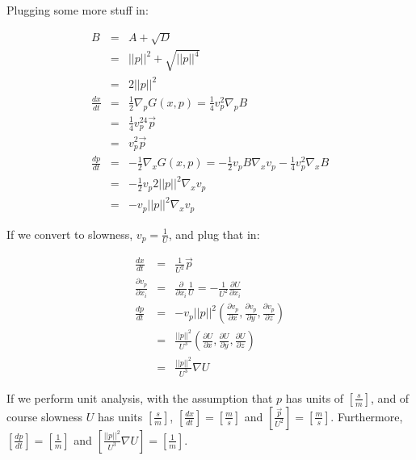 \documentclass[12pt]{article}
\begin{document}
Plugging some more stuff in:

\begin{eqnarray}
B               &=&  A + \sqrt{D}\\
                &=&  ||p||^2 + \sqrt{||p||^4}\\
                &=&  2||p||^2\\
\frac{dx}{dt}   &=&  \frac{1}{2}\nabla_p G(x,p) =  \frac{1}{4}v_p^2\nabla_pB\\
                &=&  \frac{1}{4}v_p^24\vec{p}\\
                &=&  v_p^2\vec{p}\\
\frac{dp}{dt}   &=& -\frac{1}{2}\nabla_x G(x,p) = -\frac{1}{2}v_pB\nabla_xv_p-\frac{1}{4}v_p^2\nabla_xB\\
                &=& -\frac{1}{2}v_p2||p||^2\nabla_xv_p\\
                &=& -v_p||p||^2\nabla_xv_p 
\end{eqnarray}

If we convert to slowness, $v_p=\frac{1}{U}$, and plug that in:

\begin{eqnarray}
\frac{dx}{dt}   &=&  \frac{1}{U^2}\vec{p}\\
\frac{\partial v_p}{\partial x_i} &=& \frac{\partial}{\partial x_i} \frac{1}{U} = - \frac{1}{U^2} \frac{\partial U}{\partial x_i}\\
\frac{dp}{dt}   &=&  -v_p||p||^2\left(\frac{\partial v_p}{\partial x},\frac{\partial v_p}{\partial y},\frac{\partial v_p}{\partial z}\right)\\
                &=&  \frac{||p||^2}{U^3}\left(\frac{\partial U}{\partial x},\frac{\partial U}{\partial y},\frac{\partial U}{\partial z}\right)\\
                &=&  \frac{||p||^2}{U^3}\nabla U
\end{eqnarray}

If we perform unit analysis, with the assumption that $p$ has units of $\left[\frac{s}{m}\right]$, and of course slowness $U$ has units $\left[\frac{s}{m}\right]$, $\left[\frac{dx}{dt}\right] = \left[\frac{m}{s}\right]$ and $\left[\frac{\vec{p}}{U^2}\right] = \left[\frac{m}{s}\right]$. Furthermore, $\left[\frac{dp}{dt}\right] = \left[\frac{1}{m}\right]$ and $\left[\frac{||p||^2}{U^3}\nabla U\right] = \left[\frac{1}{m}\right]$.
\end{document}
